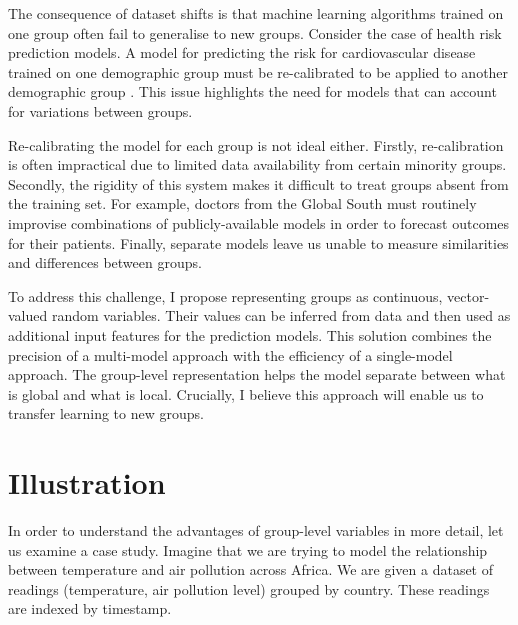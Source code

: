 \documentclass[../thesis.tex]{subfiles}
\begin{document}
The consequence of dataset shifts is that machine learning algorithms trained on one group often fail to generalise to new groups. Consider the case of health risk prediction models. A model for predicting the risk for cardiovascular disease trained on one demographic group must be re-calibrated to be applied to another demographic group \citep{mishraRecalibrationMethodsImproved2022}. This issue highlights the need for models that can account for variations between groups.

Re-calibrating the model for each group is not ideal either. Firstly, re-calibration is often impractical due to limited data availability from certain minority groups. Secondly, the rigidity of this system makes it difficult to treat groups absent from the training set. For example, doctors from the Global South must routinely improvise combinations of publicly-available models in order to forecast outcomes for their patients. Finally, separate models leave us unable to measure similarities and differences between groups.

To address this challenge, I propose representing groups as continuous, vector-valued random variables. Their values can be inferred from data and then used as additional input features for the prediction models. This solution combines the precision of a multi-model approach with the efficiency of a single-model approach. The group-level representation helps the model separate between what is global and what is local. Crucially, I believe this approach will enable us to transfer learning to new groups.



\section{Illustration}

In order to understand the advantages of group-level variables in more detail, let us examine a case study. Imagine that we are trying to model the relationship between temperature and air pollution across Africa. We are given a dataset of readings (temperature, air pollution level) grouped by country. These readings are indexed by timestamp.
\end{document}
